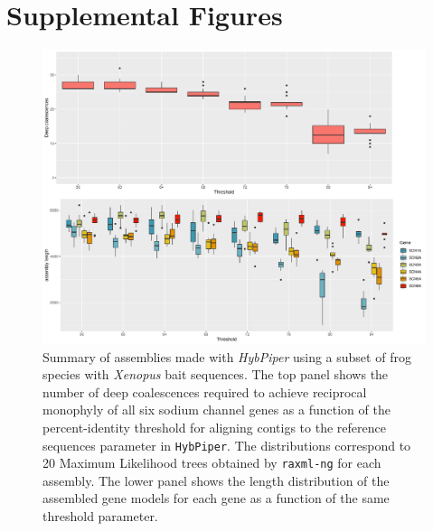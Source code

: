 \documentclass{article}
\begin{document}



\clearpage

\setcounter{table}{0}
\renewcommand{\thetable}{S\arabic{table}}%
\setcounter{figure}{0}
\renewcommand{\thefigure}{S\arabic{figure}}%
\section*{Supplemental Figures }
\begin{figure}[h!]
    \centering
    \includegraphics[scale=0.5]{figures/summary_alignments_xen_ref_orig.pdf}
    \caption{Summary of assemblies made with \textit{HybPiper} using a subset of frog species with \textit{Xenopus} bait sequences. The top panel shows the number of deep coalescences required to achieve reciprocal monophyly of all six sodium channel genes as a function of the percent-identity threshold for aligning contigs to the reference sequences parameter in \texttt{HybPiper}. The distributions correspond to 20 Maximum Likelihood trees obtained by \texttt{raxml-ng} for each assembly. The lower panel shows the length distribution of the assembled gene models for each gene as a function of the same threshold parameter.}
    \label{fig:my_label}
\end{figure}
\clearpage
\end{document}
